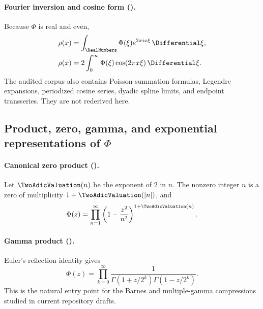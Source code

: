 \documentclass[11pt]{article}
\theoremstyle{definition}
\theoremstyle{remark}
\begin{document}
\paragraph{Fourier inversion and cosine form (\statusknownPartl).}
Because \(\Phi\) is real and even,
\begin{align}
 \rho(x)&=\int_{\RealNumbers}\Phi(\xi)e^{2\pi i x\xi}\,\Differential\xi,
                                                                  \label{p6:eq:rho-fourier-inversion}\\
 \rho(x)&=2\int_0^{\infty}\Phi(\xi)\cos(2\pi x\xi)\,\Differential\xi.
                                                                  \label{p6:eq:rho-cosine}
\end{align}
The audited corpus also contains Poisson-summation formulas, Legendre expansions,
periodized cosine series, dyadic spline limits, and endpoint transseries.  They are not
rederived here.

\subsection[Product, zero, gamma, and exponential representations of Phi]{Product, zero, gamma, and exponential representations of \(\Phi\)}

\paragraph{Canonical zero product (\statusknownPartl).}
Let \(\TwoAdicValuation(n)\) be the exponent of \(2\) in \(n\).  The nonzero integer \(n\) is a zero of
multiplicity \(1+\TwoAdicValuation(|n|)\), and
\begin{equation}
 \Phi(z)=\prod_{n=1}^{\infty}
 \left(1-\frac{z^2}{n^2}\right)^{1+\TwoAdicValuation(n)}.                \label{p6:eq:canonical-product}
\end{equation}

\paragraph{Gamma product (\statusderivedPartl).}
Euler's reflection identity gives
\begin{equation}
 \Phi(z)=\prod_{k=0}^{\infty}
 \frac{1}{\Gamma(1+z/2^k)\Gamma(1-z/2^k)}.                  \label{p6:eq:gamma-product}
\end{equation}
This is the natural entry point for the Barnes and multiple-gamma compressions studied in
current repository drafts.
\end{document}
